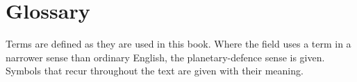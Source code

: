 
\backmatter

\chapter*{Glossary}
\thispagestyle{plain}

\noindent\small
Terms are defined as they are used in this book. Where the field uses a term
in a narrower sense than ordinary English, the planetary-defence sense is
given. Symbols that recur throughout the text are given with their meaning.


